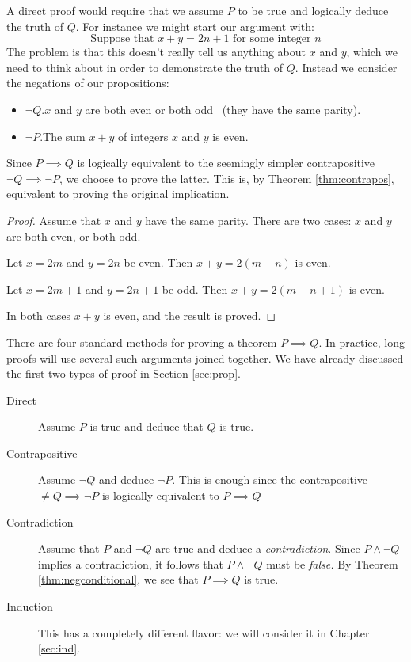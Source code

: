  A direct proof would require that we assume $P$ to be true and logically deduce the truth of $Q$. For instance we might start our argument with:
\[\text{Suppose that $x+y=2n+1$ for some integer $n$}\]
The problem is that this doesn't really tell us anything about $x$ and $y$, which we need to think about in order to demonstrate the truth of $Q$. Instead we consider the negations of our propositions:
\begin{itemize}\setlength{\itemsep}{0pt}
  \item[]$\neg Q$.\quad $x$ and $y$ are both even or both odd \ (they have the same parity).
  \item[]$\neg P$.\quad The sum $x+y$ of integers $x$ and $y$ is even.
\end{itemize}
Since $P\implies Q$ is logically equivalent to the seemingly simpler contrapositive $\neg Q\implies\neg P$, we choose to prove the latter. This is, by Theorem \ref{thm:contrapos}, equivalent to proving the original implication.

\begin{proof}
Assume that $x$ and $y$ have the same parity. There are two cases: $x$ and $y$ are both even, or both odd.
\begin{description}\setlength{\itemsep}{0pt}
  \item[Case 1:] Let $x=2m$ and $y=2n$ be even. Then $x+y=2(m+n)$ is even.
  \item[Case 2:] Let $x=2m+1$ and $y=2n+1$ be odd. Then $x+y=2(m+n+1)$ is even.
\end{description}
In both cases $x+y$ is even, and the result is proved.
\end{proof}

 


\clearpage





There are four standard methods for proving a theorem $P\implies Q$. In practice, long proofs will use several such arguments joined together. We have already discussed the first two types of proof in Section \ref{sec:prop}.

\begin{description}
	\item[Direct] Assume $P$ is true and deduce that $Q$ is true.
	\item[Contrapositive] Assume $\neg Q$ and deduce $\neg P$. This is enough since the contrapositive $\neq Q\implies\neg P$ is logically equivalent to $P\implies Q$
	\item[Contradiction] Assume that $P$ and $\neg Q$ are true and deduce a \emph{contradiction}. Since $P\wedge\neg Q$ implies a contradiction, it follows that $P\wedge\neg Q$ must be \emph{false.} By Theorem \ref{thm:negconditional}, we see that $P\implies Q$ is true.
	\item[Induction] This has a completely different flavor: we will consider it in Chapter \ref{sec:ind}.
\end{description}

